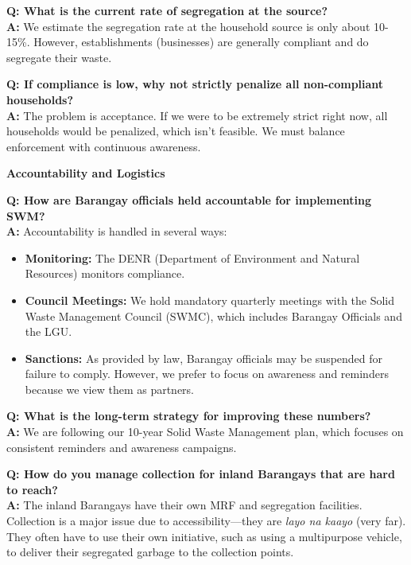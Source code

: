 \vspace{0.3cm}

\noindent \textbf{Q: What is the current rate of segregation at the source?} \\
\textbf{A:} We estimate the segregation rate at the household source is only about 10-15\%. However, establishments (businesses) are generally compliant and do segregate their waste.

\vspace{0.3cm}

\noindent \textbf{Q: If compliance is low, why not strictly penalize all non-compliant households?} \\
\textbf{A:} The problem is acceptance. If we were to be extremely strict right now, all households would be penalized, which isn't feasible. We must balance enforcement with continuous awareness.

\vspace{0.5cm}

\noindent \textbf{\large Accountability and Logistics}
\vspace{0.2cm}

\noindent \textbf{Q: How are Barangay officials held accountable for implementing SWM?} \\
\textbf{A:} Accountability is handled in several ways:
\begin{itemize}
    \item \textbf{Monitoring:} The DENR (Department of Environment and Natural Resources) monitors compliance.
    \item \textbf{Council Meetings:} We hold mandatory quarterly meetings with the Solid Waste Management Council (SWMC), which includes Barangay Officials and the LGU.
    \item \textbf{Sanctions:} As provided by law, Barangay officials may be suspended for failure to comply. However, we prefer to focus on awareness and reminders because we view them as partners.
\end{itemize}

\vspace{0.3cm}

\noindent \textbf{Q: What is the long-term strategy for improving these numbers?} \\
\textbf{A:} We are following our 10-year Solid Waste Management plan, which focuses on consistent reminders and awareness campaigns.

\vspace{0.3cm}

\noindent \textbf{Q: How do you manage collection for inland Barangays that are hard to reach?} \\
\textbf{A:} The inland Barangays have their own MRF and segregation facilities. Collection is a major issue due to accessibility—they are \textit{layo na kaayo} (very far). They often have to use their own initiative, such as using a multipurpose vehicle, to deliver their segregated garbage to the collection points.


